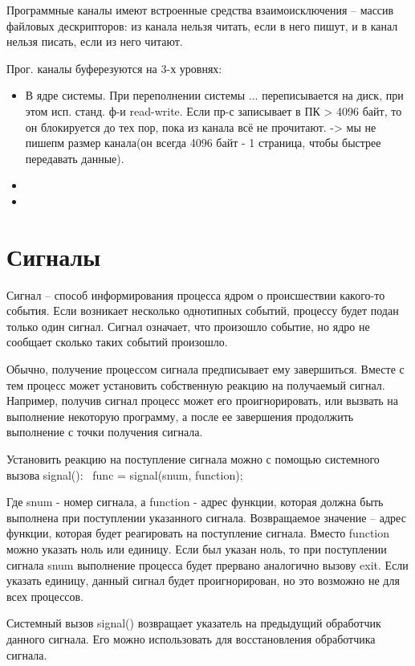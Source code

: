 Программные каналы имеют встроенные средства взаимоисключения -- массив файловых дескрипторов: из канала нельзя читать, если в него пишут, и в канал нельзя писать, если из него читают.

Прог. каналы буферезуются на 3-х уровнях: 
\begin{itemize}
	\item В ядре системы. При переполнении системы ... переписывается на диск, при этом исп. станд. ф-и read-write. Если пр-с записывает в ПК > 4096 байт, то он блокируется до тех пор,  пока из канала всё не прочитают. -> мы не пишепм размер канала(он всегда 4096 байт - 1 страница, чтобы быстрее передавать данные). 
	\item 
	\item 
\end{itemize}
	
\section{Сигналы}

Сигнал -- способ информирования процесса ядром о происшествии какого-то события. Если возникает несколько однотипных событий, процессу будет подан только один сигнал. Сигнал означает, что произошло событие, но ядро не сообщает сколько таких событий произошло.

Обычно, получение процессом сигнала предписывает ему завершиться. Вместе с тем процесс может установить собственную реакцию на получаемый сигнал. Например, получив сигнал процесс может его проигнорировать, или вызвать на выполнение некоторую программу, а после ее завершения продолжить выполнение с точки получения сигнала.

Установить реакцию на поступление сигнала можно с помощью системного вызова signal(): 
func = signal(snum, function);

Где snum - номер сигнала, а function - адрес функции, которая должна быть выполнена при поступлении указанного сигнала. Возвращаемое значение -- адрес функции, которая будет реагировать на поступление сигнала. Вместо function можно указать ноль или единицу. Если был указан ноль, то при поступлении сигнала snum выполнение процесса будет прервано аналогично вызову exit. Если указать единицу, данный сигнал будет проигнорирован, но это возможно не для всех процессов.

Системный вызов signal() возвращает указатель на предыдущий обработчик данного сигнала. Его можно использовать для восстановления обработчика сигнала.

